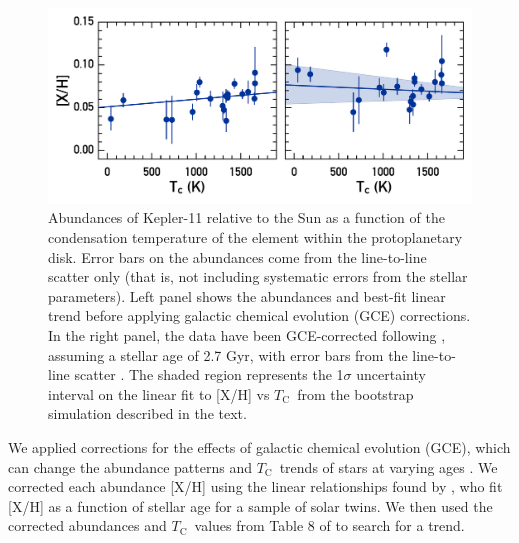 \documentclass[twocolumn,trackchanges]{aastex61}
\newcommand{\tc}{$T_\mathrm{C}$}
\begin{document}
\begin{figure}
\centering
\includegraphics[scale=0.6]{K11_Tc_linear}
\caption{Abundances of Kepler-11 relative to the Sun as a function of the condensation temperature of the element within the protoplanetary disk. Error bars on the abundances come from the line-to-line scatter only (that is, not including systematic errors from the stellar parameters). Left panel shows the abundances and best-fit linear trend before applying galactic chemical evolution (GCE) corrections. In the right panel, the data have been GCE-corrected following \citet{Spina2016b}, assuming a stellar age of 2.7 Gyr, with error bars from the line-to-line scatter . The shaded region represents the 1$\sigma$ uncertainty interval on the linear fit to [X/H] vs \tc\ from the bootstrap simulation described in the text.}
\label{fig:tc}
\end{figure}

We applied corrections for the effects of galactic chemical evolution (GCE), which can change the abundance patterns and \tc\ trends of stars at varying ages \citep{Nissen2015, Spina2016}. We corrected each abundance [X/H] using the linear relationships found by \citet{Spina2016b}, who fit [X/H] as a function of stellar age for a sample of solar twins. We then used the corrected abundances and \tc\ values from Table 8 of \citet{Lodders2003} to search for a trend.
\end{document}
